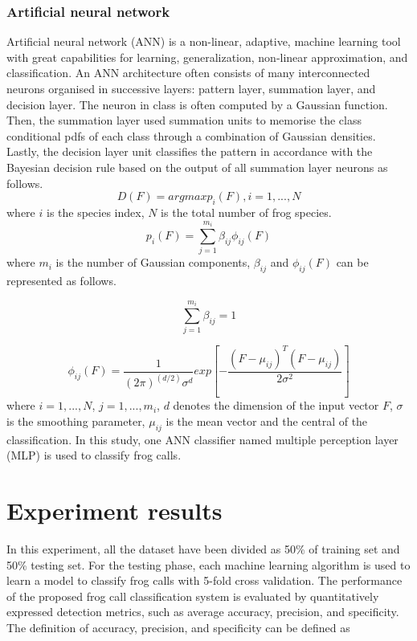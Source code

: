 \subsubsection{Artificial neural network}
Artificial neural network (ANN) is a non-linear, adaptive, machine learning tool with great capabilities for learning, generalization, non-linear approximation, and classification. An ANN architecture often consists of many interconnected neurons organised in successive layers: pattern layer, summation layer, and decision layer. The neuron in class is often computed by a Gaussian function. Then, the summation layer used summation units to memorise the class conditional pdfs of each class through a combination of Gaussian densities. Lastly, the decision layer unit classifies the pattern in accordance with the Bayesian decision rule based on the output of all summation layer neurons as follows.
\begin{equation}
D(F)=argmax{p_{i}(F)}, i =1,...,N
\end{equation}
where $i$ is the species index, $N$ is the total number of frog species.
\begin{equation}
p_{i}(F)=\sum_{j=1}^{m_{i}}\beta_{ij}\phi_{ij}(F)
\end{equation}
where $m_{i}$ is the number of Gaussian components, $\beta_{ij}$ and $\phi_{ij}(F)$ can be represented as follows.

\begin{equation}
\sum_{j=1}^{m_{i}}\beta_{ij}=1
\end{equation}

\begin{equation}
\phi_{ij}(F)=\frac{1}{(2\pi)^(d/2)\sigma^{d}}exp[-\frac{(F-\mu_{ij})^{T}(F-\mu_{ij})}{2\sigma^2}]
\end{equation}
where $i=1,...,N$, $j=1,...,m_{i}$, $d$ denotes the dimension of the input vector $F$, $\sigma$ is the smoothing parameter, $\mu_{ij}$ is the mean vector and the central of the classification. In this study, one ANN classifier named multiple perception layer (MLP) is used to classify frog calls.

\section{Experiment results}
In this experiment, all the dataset have been divided as 50\% of training set and 50\% testing set. For the testing phase, each machine learning algorithm is used to learn a model to classify frog calls with 5-fold cross validation. The performance of the proposed frog call classification system is evaluated by quantitatively expressed detection metrics, such as average accuracy, precision, and specificity. The definition of accuracy, precision, and specificity can be defined as

